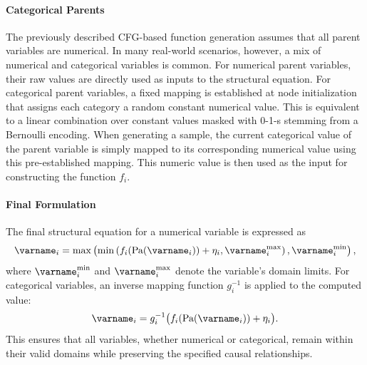 \documentclass{article}
\begin{document}
            \paragraph{Categorical Parents}
                The previously described CFG-based function generation assumes that all parent variables are numerical. 
                In many real-world scenarios, however, a mix of numerical and categorical variables is common. 
                For numerical parent variables, their raw values are directly used as inputs to the structural equation. 
                For categorical parent variables, a fixed mapping is established at node initialization that assigns each category a random constant numerical value. 
                This is equivalent to a linear combination over constant values masked with 0-1-s stemming from a Bernoulli encoding.
                When generating a sample, the current categorical value of the parent variable is simply mapped to its corresponding numerical value using this pre-established mapping. 
                This numeric value is then used as the input for constructing the function \( f_i \). 

            
            


            \paragraph{Final Formulation}  
                The final structural equation for a numerical variable is expressed as
                \begin{equation*}
                    \varname_i = \max \left( \min \left( f_i(\text{Pa}(\varname_i)) + \eta_i, \varname_i^{\text{max}} \right), \varname_i^{\text{min}} \right),
                \end{equation*}
                where $\varname_i^{\text{min}}$ and $\varname_i^{\text{max}}$ denote the variable’s domain limits. For categorical variables, an inverse mapping function $g_i^{-1}$ is applied to the computed value:
                \begin{equation*}
                    \varname_i = g_i^{-1}\bigl(f_i(\text{Pa}(\varname_i)) + \eta_i\bigr).
                \end{equation*}
                This ensures that all variables, whether numerical or categorical, remain within their valid domains while preserving the specified causal relationships.
        
\end{document}
